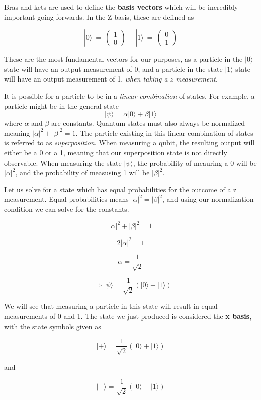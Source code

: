 \documentclass[11pt]{article}
\begin{document}
    Bras and kets are used to define the \textbf{basis vectors} which will
be incredibly important going forwards. In the Z basis, these are
defined as

\[|0\rangle \ = \ \begin{pmatrix} 1 \\ 0 \end{pmatrix} \ \ \ \ \ \ |1\rangle \ = \ \begin{pmatrix} 0 \\ 1 \end{pmatrix}\]

These are the most fundamental vectors for our purposes, as a particle
in the \(|0\rangle\) state will have an output measurement of 0, and a
particle in the state \(|1\rangle\) state will have an output
measurement of 1, \emph{when taking a z measurement}.

It is possible for a particle to be in a \emph{linear combination} of
states. For example, a particle might be in the general state
\[|\psi\rangle = \alpha|0\rangle + \beta|1\rangle\] where \(\alpha\) and
\(\beta\) are constants. Quantum states must also always be normalized
meaning \(|\alpha|^2 + |\beta|^2 = 1\). The particle existing in this
linear combination of states is referred to as \emph{superposition}.
When measuring a qubit, the resulting output will either be a 0 or a 1,
meaning that our superposition state is not directly observable. When
measuring the state \(|\psi\rangle\), the probability of meauring a 0
will be \(|\alpha|^2\), and the probability of measusing 1 will be
\(|\beta|^2\).

Let us solve for a state which has equal probabilities for the outcome
of a z measurement. Equal probabilities means
\(|\alpha|^2 = |\beta|^2\), and using our normalization condition we can
solve for the constants.

\[|\alpha|^2 + |\beta|^2 = 1\]

\[2|\alpha|^2 = 1\]

\[\alpha = \frac{1}{\sqrt{2}}\]

\[\implies |\psi\rangle = \frac{1}{\sqrt{2}}(|0\rangle + |1\rangle)\]

We will see that measuring a particle in this state will result in equal
measurements of 0 and 1. The state we just produced is considered the
\textbf{x basis}, with the state symbols given as

\[|+\rangle = \frac{1}{\sqrt{2}}(|0\rangle + |1\rangle)\]

and

\[|-\rangle = \frac{1}{\sqrt{2}}(|0\rangle - |1\rangle)\]
\end{document}
